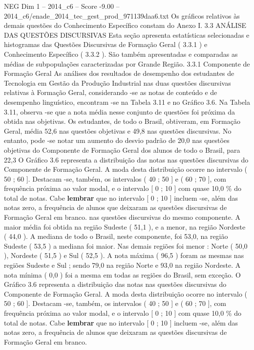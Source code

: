 \begin{textsample}{NEG Dim 1 – 2014\_c6 – Score -9.00 – 2014\_c6/enade\_2014\_tec\_gest\_prod\_971139daa6.txt}
Os gráficos relativos às demais questões do Conhecimento Específico constam do Anexo I. 3.3 ANÁLISE DAS QUESTÕES DISCURSIVAS Esta seção apresenta estatísticas selecionadas e histogramas das Questões Discursivas de Formação Geral ( 3.3.1 ) e Conhecimento Específico ( 3.3.2 ).
São também apresentadas e comparadas as médias de subpopulações caracterizadas por Grande Região. 3.3.1 Componente de Formação Geral As análises dos resultados de desempenho dos estudantes de Tecnologia em Gestão da Produção Industrial nas duas questões discursivas relativas à Formação Geral, considerando -se as notas de conteúdo e de desempenho linguístico, encontram -se na Tabela 3.11 e no Gráfico 3.6.
Na Tabela 3.11, observa -se que a nota média nesse conjunto de questões foi próxima da obtida nas objetivas.
Os estudantes, de todo o Brasil, obtiveram, em Formação Geral, média 52,6 nas questões objetivas e 49,8 nas questões discursivas.
No entanto, pode -se notar um aumento do desvio padrão de 20,0 nas questões objetivas do Componente de Formação Geral dos alunos de todo o Brasil, para 22,3 O Gráfico 3.6 representa a distribuição das notas nas questões discursivas do Componente de Formação Geral.
A moda desta distribuição ocorre no intervalo ( 50 ; 60 ].
Destacam -se, também, os intervalos ( 40 ; 50 ] e ( 60 ; 70 ], com frequência próxima ao valor modal, e o intervalo [ 0 ; 10 ] com quase 10,0 \% do total de notas.
Cabe \textbf{lembrar} que no intervalo [ 0 ; 10 ] incluem -se, além das notas zero, a frequência de alunos que deixaram as questões discursivas de Formação Geral em branco. nas questões discursivas do mesmo componente.
A maior média foi obtida na região Sudeste ( 51,1 ), e a menor, na região Nordeste ( 44,0 ).
A mediana de todo o Brasil, neste componente, foi 53,0, na região Sudeste ( 53,5 ) a mediana foi maior.
Nas demais regiões foi menor : Norte ( 50,0 ), Nordeste ( 51,5 ) e Sul ( 52,5 ).
A nota máxima ( 96,5 ) foram as mesmas nas regiões Sudeste e Sul ; sendo 79,0 na região Norte e 93,0 na região Nordeste.
A nota mínima ( 0,0 ) foi a mesma em todas as regiões do Brasil, sem exceção.
O Gráfico 3.6 representa a distribuição das notas nas questões discursivas do Componente de Formação Geral.
A moda desta distribuição ocorre no intervalo ( 50 ; 60 ].
Destacam -se, também, os intervalos ( 40 ; 50 ] e ( 60 ; 70 ], com frequência próxima ao valor modal, e o intervalo [ 0 ; 10 ] com quase 10,0 \% do total de notas.
Cabe \textbf{lembrar} que no intervalo [ 0 ; 10 ] incluem -se, além das notas zero, a frequência de alunos que deixaram as questões discursivas de Formação Geral em branco.

\end{textsample}

